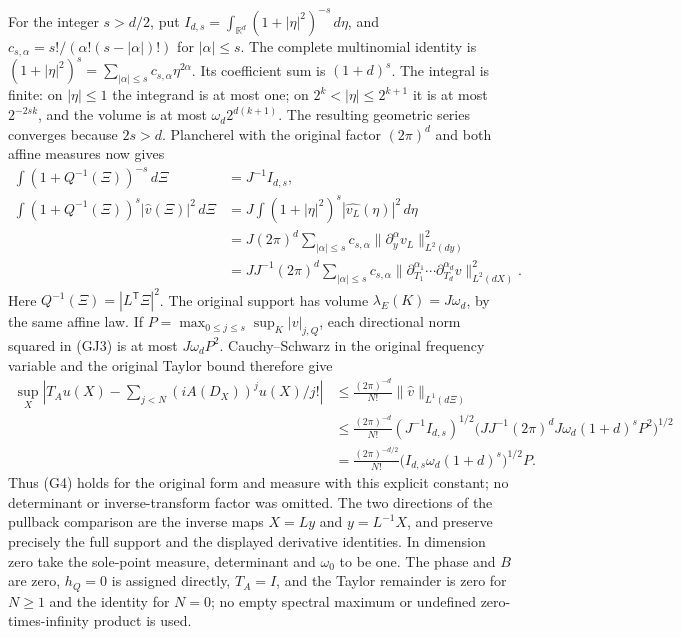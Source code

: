 \documentclass[
  11pt,
]{article}
\begin{document}
For the integer \(s>d/2\), put
\(I_{d,s}=\int_{\mathbb R^d}(1+|\eta|^2)^{-s}\,d\eta\), and
\(c_{s,\alpha}=s!/(\alpha!(s-|\alpha|)!)\) for \(|\alpha|\leq s\). The
complete multinomial identity is
\((1+|\eta|^2)^s=\sum_{|\alpha|\leq s}c_{s,\alpha}\eta^{2\alpha}\). Its
coefficient sum is \((1+d)^s\). The integral is finite: on
\(|\eta|\leq1\) the integrand is at most one; on
\(2^k<|\eta|\leq2^{k+1}\) it is at most \(2^{-2sk}\), and the volume is
at most \(\omega_d2^{d(k+1)}\). The resulting geometric series converges
because \(2s>d\). Plancherel with the original factor \((2\pi)^d\) and
both affine measures now gives \[
 \begin{aligned}
 \int(1+Q^{-1}(\Xi))^{-s}\,d\Xi&=J^{-1}I_{d,s},\\
 \int(1+Q^{-1}(\Xi))^s|\widehat v(\Xi)|^2\,d\Xi
 &=J\int(1+|\eta|^2)^s|\widehat{v_L}(\eta)|^2\,d\eta\\
 &=J(2\pi)^d\sum_{|\alpha|\leq s}c_{s,\alpha}
       \|\partial_y^\alpha v_L\|_{L^2(dy)}^2\\
 &=JJ^{-1}(2\pi)^d\sum_{|\alpha|\leq s}c_{s,\alpha}
       \|\partial_{T_1}^{\alpha_1}\cdots\partial_{T_d}^{\alpha_d}v\|_{L^2(dX)}^2.
 \end{aligned}
 \tag{GJ3}
\] Here \(Q^{-1}(\Xi)=|L^{\mathsf T}\Xi|^2\). The original support has
volume \(\lambda_E(K)=J\omega_d\), by the same affine law. If
\(P=\max_{0\leq j\leq s}\sup_K|v|_{j,Q}\), each directional norm squared
in (GJ3) is at most \(J\omega_dP^2\). Cauchy--Schwarz in the original
frequency variable and the original Taylor bound therefore give \[
 \begin{aligned}
 \sup_X\left|T_Au(X)-\sum_{j<N}(iA(D_X))^ju(X)/j!\right|
 &\leq\frac{(2\pi)^{-d}}{N!}\|\widehat v\|_{L^1(d\Xi)}\\
 &\leq\frac{(2\pi)^{-d}}{N!}
 (J^{-1}I_{d,s})^{1/2}
 \bigl(JJ^{-1}(2\pi)^dJ\omega_d(1+d)^sP^2\bigr)^{1/2}\\
 &=\frac{(2\pi)^{-d/2}}{N!}
 \bigl(I_{d,s}\omega_d(1+d)^s\bigr)^{1/2}P.
 \end{aligned}
 \tag{GJ4}
\] Thus (G4) holds for the original form and measure with this explicit
constant; no determinant or inverse-transform factor was omitted. The
two directions of the pullback comparison are the inverse maps \(X=Ly\)
and \(y=L^{-1}X\), and preserve precisely the full support and the
displayed derivative identities. In dimension zero take the sole-point
measure, determinant and \(\omega_0\) to be one. The phase and \(B\) are
zero, \(h_Q=0\) is assigned directly, \(T_A=I\), and the Taylor
remainder is zero for \(N\geq1\) and the identity for \(N=0\); no empty
spectral maximum or undefined zero-times-infinity product is used.
\end{document}
